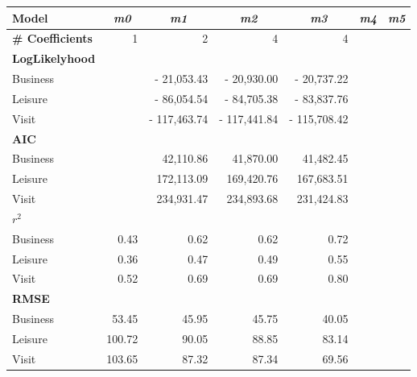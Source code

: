 \begin{tabular}{lrrrrrr}
\toprule
\textbf{Model} & \multicolumn{1}{c}{\textit{\textbf{m0}}} & \multicolumn{1}{c}{\textit{\textbf{m1}}} & \multicolumn{1}{c}{\textit{\textbf{m2}}} & \multicolumn{1}{c}{\textit{\textbf{m3}}} & \multicolumn{1}{c}{\textit{\textbf{m4}}} & \multicolumn{1}{c}{\textit{\textbf{m5}}} \\
\midrule
\textbf{\# Coefficients} & 1     & 2     & 4     & 4     &       &  \\
\midrule
\textbf{LogLikelyhood} &       &       &       &       &       &  \\
Business &       & -   21,053.43  & -   20,930.00  & -   20,737.22  &       &  \\
Leisure &       & -   86,054.54  & -   84,705.38  & -   83,837.76  &       &  \\
Visit &       & - 117,463.74  & - 117,441.84  & - 115,708.42  &       &  \\
\midrule
\textbf{AIC} &       &       &       &       &       &  \\
Business &       &      42,110.86  &      41,870.00  &      41,482.45  &       &  \\
Leisure &       &    172,113.09  &    169,420.76  &    167,683.51  &       &  \\
Visit &       &    234,931.47  &    234,893.68  &    231,424.83  &       &  \\
\midrule
\boldmath{}\textbf{$r^2$}\unboldmath{} &       &       &       &       &       &  \\
Business & 0.43  & 0.62  & 0.62  & 0.72  &       &  \\
Leisure & 0.36  & 0.47  & 0.49  & 0.55  &       &  \\
Visit & 0.52  & 0.69  & 0.69  & 0.80  &       &  \\
\midrule
\textbf{RMSE} &       &       &       &       &       &  \\
Business & 53.45 & 45.95 & 45.75 & 40.05 &       &  \\
Leisure & 100.72 & 90.05 & 88.85 & 83.14 &       &  \\
Visit & 103.65 & 87.32 & 87.34 & 69.56 &       &  \\
\bottomrule
\end{tabular}%

